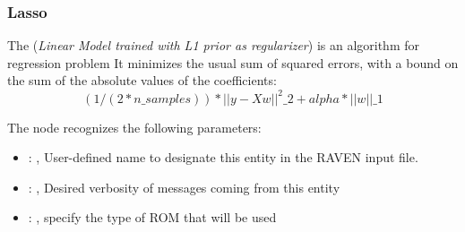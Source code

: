 \subsubsection{Lasso}
  The  (\textit{Linear Model trained with L1 prior as regularizer})
  is an algorithm for regression problem                         It minimizes the usual sum of
  squared errors, with a bound on the sum of the                         absolute values of the
  coefficients:                         \begin{equation}                          (1 / (2 *
  n\_samples)) * ||y - Xw||^2\_2 + alpha * ||w||\_1                         \end{equation}

  The  node recognizes the following parameters:
    \begin{itemize}
      \item {}: , 
        User-defined name to designate this entity in the RAVEN input file.
      \item {}: , 
        Desired verbosity of messages coming from this entity
      \item {}: , 
        specify the type of ROM that will be used
  \end{itemize}

